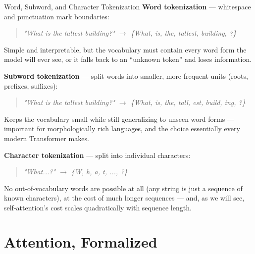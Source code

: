 \begin{vbframe}{Word, Subword, and Character Tokenization}
\textbf{Word tokenization} --- whitespace and punctuation mark boundaries:
\begin{quote}
\small\it "What is the tallest building?" $\to$ \{What, is, the, tallest, building, ?\}
\end{quote}
Simple and interpretable, but the vocabulary must contain every word form the model will ever see, or it falls back to an ``unknown token'' and loses information.

\framebreak

\textbf{Subword tokenization} --- split words into smaller, more frequent units (roots, prefixes, suffixes):
\begin{quote}
\small\it "What is the tallest building?" $\to$ \{What, is, the, tall, est, build, ing, ?\}
\end{quote}
Keeps the vocabulary small while still generalizing to unseen word forms --- important for morphologically rich languages, and the choice essentially every modern Transformer makes.

\framebreak

\textbf{Character tokenization} --- split into individual characters:
\begin{quote}
\small\it "What...?" $\to$ \{W, h, a, t, ..., ?\}
\end{quote}
No out-of-vocabulary words are possible at all (any string is just a sequence of known characters), at the cost of much longer sequences --- and, as we will see, self-attention's cost scales quadratically with sequence length.
\end{vbframe}


\section{Attention, Formalized}


